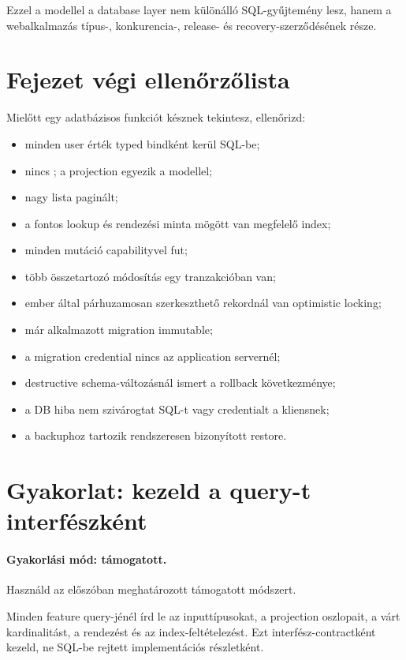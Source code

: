 Ezzel a modellel a database layer nem különálló SQL-gyűjtemény lesz, hanem a webalkalmazás típus-, konkurencia-, release- és recovery-szerződésének része.

\section{Fejezet végi ellenőrzőlista}

Mielőtt egy adatbázisos funkciót késznek tekintesz, ellenőrizd:

\begin{itemize}
\item minden user érték typed bindként kerül SQL-be;
\item nincs ; a projection egyezik a modellel;
\item nagy lista paginált;
\item a fontos lookup és rendezési minta mögött van megfelelő index;
\item minden mutáció  capabilityvel fut;
\item több összetartozó módosítás egy tranzakcióban van;
\item ember által párhuzamosan szerkeszthető rekordnál van optimistic locking;
\item már alkalmazott migration immutable;
\item a migration credential nincs az application servernél;
\item destructive schema-változásnál ismert a rollback következménye;
\item a DB hiba nem szivárogtat SQL-t vagy credentialt a kliensnek;
\item a backuphoz tartozik rendszeresen bizonyított restore.
\end{itemize}

\section{Gyakorlat: kezeld a query-t interfészként}
\paragraph{Gyakorlási mód: támogatott.} Használd az előszóban meghatározott támogatott módszert.

Minden feature query-jénél írd le az inputtípusokat, a projection oszlopait, a várt kardinalitást, a rendezést és az index-feltételezést. Ezt interfész-contractként kezeld, ne SQL-be rejtett implementációs részletként.

